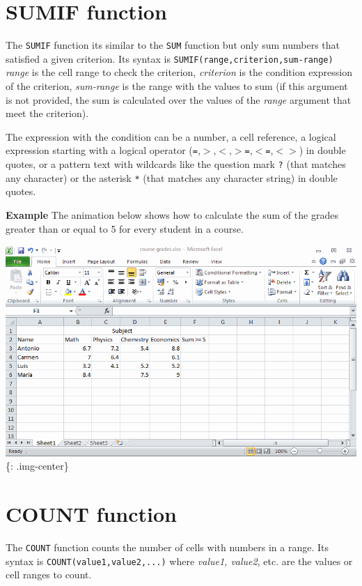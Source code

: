 \section{SUMIF function}
\label{sumiffunction}

The \texttt{SUMIF} function its similar to the \texttt{SUM} function but only sum numbers that satisfied a given criterion. Its syntax is \texttt{SUMIF(range,criterion,sum-range)} \emph{range} is the cell range to check the criterion, \emph{criterion} is the condition expression of the criterion, \emph{sum-range} is the range with the values to sum (if this argument is not provided, the sum is calculated over the values of the \emph{range} argument that meet the criterion). 

The expression with the condition can be a number, a cell reference, a logical expression starting with a logical operator (\texttt{=},\texttt{$>$},\texttt{$<$},\texttt{$>$=},\texttt{$<$=},\texttt{$<$$>$}) in double quotes, or a pattern text with wildcards like the question mark \texttt{?} (that matches any character) or the asterisk \texttt{*} (that matches any character string) in double quotes.

\textbf{Example} The animation below shows how to calculate the sum of the grades greater than or equal to 5 for every student in a course. 

\includegraphics[keepaspectratio,width=\textwidth,height=0.75\textheight]{img/example_function_sumif.gif}
\{: .img-center\}

\section{COUNT function}
\label{countfunction}

The \texttt{COUNT} function counts the number of cells with numbers in a range. Its syntax is \texttt{COUNT(value1,value2,...)} where \emph{value1, value2}, etc. are the values or cell ranges to count. 

